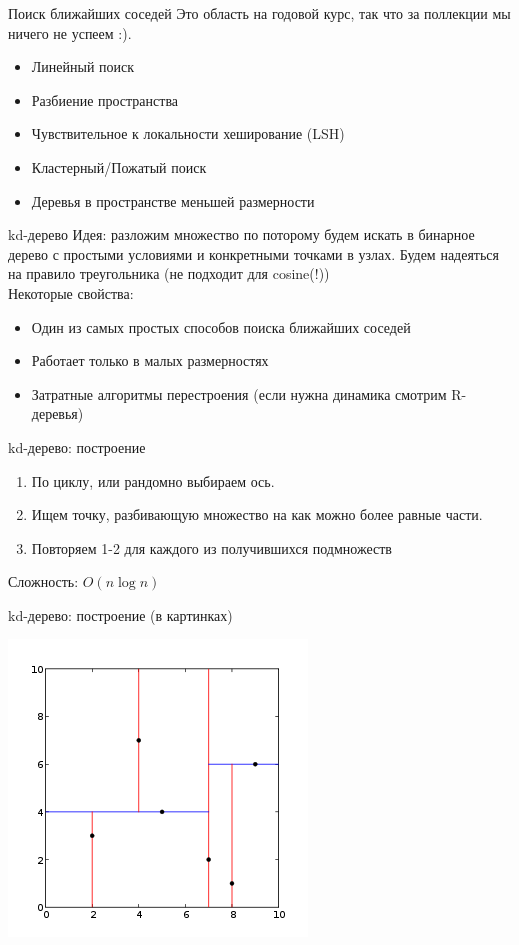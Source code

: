 \documentclass[14pt, fleqn, xcolor={dvipsnames, table}]{beamer}
\begin{document}
\begin{frame}{Поиск ближайших соседей}
  Это область на годовой курс, так что за поллекции мы ничего не успеем :).
  \begin{itemize}
    \item Линейный поиск
    \item Разбиение пространства
    \item Чувствительное к локальности хеширование (LSH)
    \item Кластерный/Пожатый поиск
    \item Деревья в пространстве меньшей размерности
  \end{itemize}
\end{frame}

\begin{frame}{kd-дерево}
  Идея: разложим множество по поторому будем искать в бинарное дерево с простыми условиями и конкретными точками в узлах. Будем надеяться на правило треугольника (не подходит для cosine(!)) \\
  Некоторые свойства:
  \begin{itemize}
    \item Один из самых простых способов поиска ближайших соседей
    \item Работает только в малых размерностях
    \item Затратные алгоритмы перестроения (если нужна динамика смотрим R-деревья)
  \end{itemize}  
\end{frame}

\begin{frame}{kd-дерево: построение}
\begin{enumerate}
  \item По циклу, или рандомно выбираем ось.
  \item Ищем точку, разбивающую множество на как можно более равные части.
  \item Повторяем 1-2 для каждого из получившихся подмножеств
\end{enumerate}
Сложность: $O(n \log n)$
\end{frame}

\begin{frame}{kd-дерево: построение (в картинках)}
\begin{center}
\includegraphics[height=0.9\textheight]{300px-Kdtree_2d.png}
\end{center}
\end{frame}
\end{document}
